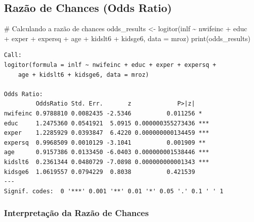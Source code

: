\documentclass[
  letterpaper,
  DIV=11,
  numbers=noendperiod]{scrartcl}
\newenvironment{Shaded}{\begin{snugshade}}{\end{snugshade}}
\newcommand{\AttributeTok}[1]{\textcolor[rgb]{0.40,0.45,0.13}{#1}}
\newcommand{\CommentTok}[1]{\textcolor[rgb]{0.37,0.37,0.37}{#1}}
\newcommand{\FunctionTok}[1]{\textcolor[rgb]{0.28,0.35,0.67}{#1}}
\newcommand{\NormalTok}[1]{\textcolor[rgb]{0.00,0.23,0.31}{#1}}
\newcommand{\OtherTok}[1]{\textcolor[rgb]{0.00,0.23,0.31}{#1}}
\newcommand{\SpecialCharTok}[1]{\textcolor[rgb]{0.37,0.37,0.37}{#1}}
\begin{document}
\subsection{Razão de Chances (Odds
Ratio)}\label{razuxe3o-de-chances-odds-ratio}

\begin{Shaded}
\begin{Highlighting}[]
\CommentTok{\# Calculando a razão de chances}
\NormalTok{odds\_results }\OtherTok{\textless{}{-}} \FunctionTok{logitor}\NormalTok{(inlf }\SpecialCharTok{\textasciitilde{}}\NormalTok{ nwifeinc }\SpecialCharTok{+}\NormalTok{ educ }\SpecialCharTok{+}\NormalTok{ exper }\SpecialCharTok{+}\NormalTok{ expersq }\SpecialCharTok{+}\NormalTok{ age }\SpecialCharTok{+}\NormalTok{ kidslt6 }\SpecialCharTok{+}\NormalTok{ kidsge6,}
                        \AttributeTok{data =}\NormalTok{ mroz)}
\FunctionTok{print}\NormalTok{(odds\_results)}
\end{Highlighting}
\end{Shaded}

\begin{verbatim}
Call:
logitor(formula = inlf ~ nwifeinc + educ + exper + expersq + 
    age + kidslt6 + kidsge6, data = mroz)

Odds Ratio:
         OddsRatio Std. Err.       z             P>|z|    
nwifeinc 0.9788810 0.0082435 -2.5346          0.011256 *  
educ     1.2475360 0.0541921  5.0915 0.000000355273436 ***
exper    1.2285929 0.0393847  6.4220 0.000000000134459 ***
expersq  0.9968509 0.0010129 -3.1041          0.001909 ** 
age      0.9157386 0.0133450 -6.0403 0.000000001538446 ***
kidslt6  0.2361344 0.0480729 -7.0898 0.000000000001343 ***
kidsge6  1.0619557 0.0794229  0.8038          0.421539    
---
Signif. codes:  0 '***' 0.001 '**' 0.01 '*' 0.05 '.' 0.1 ' ' 1
\end{verbatim}

\subsubsection{Interpretação da Razão de
Chances}\label{interpretauxe7uxe3o-da-razuxe3o-de-chances}
\end{document}
